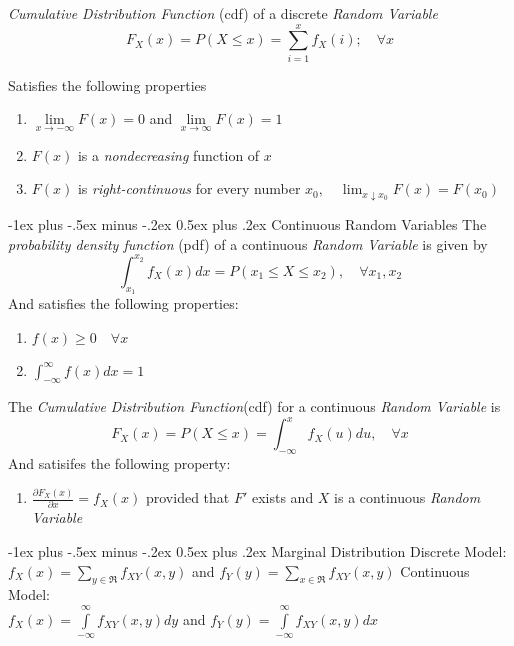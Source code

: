 \documentclass[10pt,landscape]{article}
\makeatletter
\renewcommand{\section}{\@startsection{section}{1}{0mm}%
                                {-1ex plus -.5ex minus -.2ex}%
                                {0.5ex plus .2ex}%
                                {\normalfont\large\bfseries}}
\makeatother
\begin{document}
\begin{multicols}{3}
\emph{Cumulative Distribution Function} (cdf) of a discrete \emph{Random Variable} %
$$F_X(x)=P(X\leq x)=\sum\limits_{i=1}^{x}f_X(i); \quad \forall x$$

Satisfies the following properties
\begin{enumerate}
\item $\lim\limits_{x\to-\infty}F(x)=0$ and $\lim\limits_{x\to\infty}F(x)=1$
\item $F(x)$ is a \emph{nondecreasing} function of $x$
\item $F(x)$ is \emph{right-continuous} for every number $x_0, \quad \lim_{x\downarrow x_0}F(x)=F(x_0)$
\end{enumerate}

\section{Continuous Random Variables}
The \emph{probability density function} (pdf) of a continuous \emph{Random Variable} is given by %
$$\int_{x_1}^{x_2}f_X(x)dx=P(x_1\leq X\leq x_2), \quad \forall x_1,x_2$$
And satisfies the following properties:
\begin{enumerate}
\item $f(x)\geq 0 \quad \forall x$
\item $\int_{-\infty}^{\infty}f(x)dx=1$
\end{enumerate}

The \emph{Cumulative Distribution Function}(cdf) for a continuous \emph{Random Variable} is %
$$F_X(x)=P(X \leq x) = \int_{-\infty}^{x}f_X(u)du, \quad \forall x$$
And satisifes the following property:
\begin{enumerate}
\item $\frac{\partial F_X(x)}{\partial x}=f_X(x)$ provided that $F'$ exists and $X$ is a continuous \emph{Random Variable}
\end{enumerate}

\section{Marginal Distribution}
Discrete Model:\\
$f_X(x)=\sum\limits_{y\in\Re}f_{XY}(x,y)$ and $f_Y(y)=\sum\limits_{x\in\Re}f_{XY}(x,y)$
Continuous Model:\\
$f_X(x)=\int\limits_{-\infty}^{\infty}f_{XY}(x,y)dy$ and $f_Y(y)=\int\limits_{-\infty}^{\infty}f_{XY}(x,y)dx$


\end{multicols}
\end{document}
